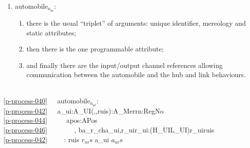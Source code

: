 {

\begin{enumerate}\setei              
\item \label{p-process-040} \textsf{automobile$_{a_{ui}}$}:
\begin{enumerate}
\item \label{p-process-042} there is the usual ``triplet'' of arguments:
                          unique identifier, mereology and static
                          attributes;
\item \label{p-process-044} then there is the one programmable attribute;
\item \label{p-process-046} and finally there are the input/output
                          channel references allowing communication between
                          the automobile and the hub and link behaviours.
\end{enumerate}
\savei\end{enumerate}\footsize\sf\HHHH
\pos{\psno}{\mnewfoil}
\bp
{}\\
\ref{p-process-040}\ \ \ automobile$_{a_{ui}}$: \\
\ref{p-process-042}\ \ \ a\_ui:A\_UI{\TIMES}({\UNDERLINE},{\UNDERLINE},ruis):A\_Mer{\TIMES}rn:RegNo\\
\ref{p-process-044}\ \ \ \ \ {\RIGHTARROW} apos:APos\\
\ref{p-process-046}\ \ \ \ \ \ \ \ , {\LBRACE}ba\_r\_ch{\LBRACKET}a\_ui,r\_ui{\RBRACKET}{\BAR}r\_ui:(H\_UI{\BAR}L\_UI){\RDOT}r\_ui{\ISIN}ruis{\RBRACE} \\
\ref{p-process-042}\ \ \ \ \ : ruis {\EQ} $r_{ui}s$ {\WEDGE} a\_ui {\ISIN} $a_{ui}s$ \eox
\ep
\normalsize\rm
\vspace*{1mm}
}\normalsize\rm\HHHH

